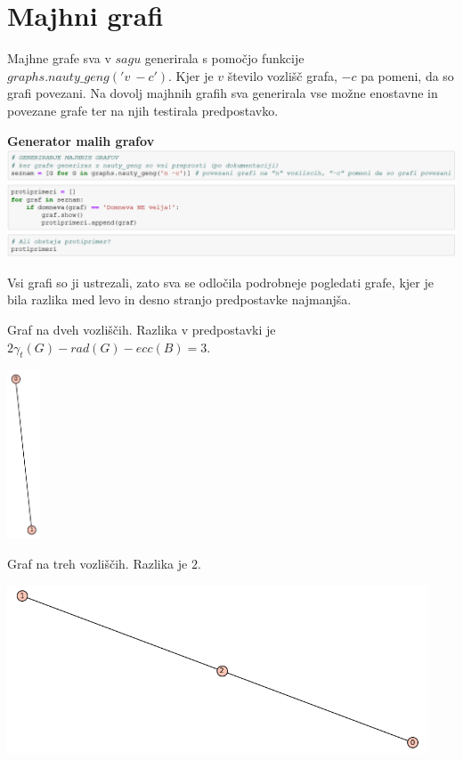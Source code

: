 \documentclass[10pt, a4paper]{article}
\begin{document}
\section{Majhni grafi}

Majhne grafe sva v $sagu$ generirala s pomočjo funkcije $graphs.nauty\_geng('v\ -c')$. Kjer je $v$ število vozlišč grafa, $-c$ pa pomeni, da so grafi povezani. Na dovolj majhnih grafih sva generirala vse možne enostavne in povezane grafe ter na njih testirala predpostavko.

\begin{center}
\textbf{Generator malih grafov}
\includegraphics[width=16cm]{mali_grafi}
\end{center}

Vsi grafi so ji ustrezali, zato sva se odločila podrobneje pogledati grafe, kjer je bila razlika med levo in desno stranjo predpostavke najmanjša.

Graf na dveh vozliščih. Razlika v predpostavki je  $2\gamma_{t}(G) - rad(G) - ecc(B) = 3$.

\begin{center}
\includegraphics[height=5cm]{min_graf_2}
\end{center}

Graf na treh vozliščih. Razlika je $2$.

\begin{center}
\includegraphics[height=5cm]{min_graf_3}
\end{center}
\end{document}

